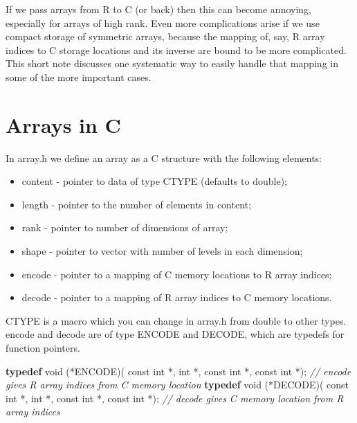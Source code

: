 \documentclass[
  12pt,
]{article}
\newenvironment{Shaded}{\begin{snugshade}}{\end{snugshade}}
\newcommand{\CommentTok}[1]{\textcolor[rgb]{0.56,0.35,0.01}{\textit{#1}}}
\newcommand{\DataTypeTok}[1]{\textcolor[rgb]{0.13,0.29,0.53}{#1}}
\newcommand{\KeywordTok}[1]{\textcolor[rgb]{0.13,0.29,0.53}{\textbf{#1}}}
\newcommand{\NormalTok}[1]{#1}
\providecommand{\tightlist}{%
  \setlength{\itemsep}{0pt}\setlength{\parskip}{0pt}}
\begin{document}
If we pass arrays from R to C (or back) then this can become annoying,
especially for arrays of high rank. Even more complications arise if we
use compact storage of symmetric arrays, because the mapping of, say, R
array indices to C storage locations and its inverse are bound to be
more complicated. This short note discusses one systematic way to easily
handle that mapping in some of the more important cases.

\hypertarget{arrays-in-c}{%
\section{Arrays in C}\label{arrays-in-c}}

In array.h we define an array as a C structure with the following
elements:

\begin{itemize}
\tightlist
\item
  content - pointer to data of type CTYPE (defaults to double);
\item
  length - pointer to the number of elements in content;
\item
  rank - pointer to number of dimensions of array;
\item
  shape - pointer to vector with number of levels in each dimension;
\item
  encode - pointer to a mapping of C memory locations to R array
  indices;
\item
  decode - pointer to a mapping of R array indices to C memory
  locations.
\end{itemize}

CTYPE is a macro which you can change in array.h from double to other
types. encode and decode are of type ENCODE and DECODE, which are
typedefs for function pointers.

\begin{Shaded}
\begin{Highlighting}[]
\KeywordTok{typedef} \DataTypeTok{void}\NormalTok{ (*ENCODE)(}
    \DataTypeTok{const} \DataTypeTok{int}\NormalTok{ *, }\DataTypeTok{int}\NormalTok{ *, }\DataTypeTok{const} \DataTypeTok{int}\NormalTok{ *,}
    \DataTypeTok{const} \DataTypeTok{int}\NormalTok{ *); }\CommentTok{// encode gives R array indices from C memory location}
\KeywordTok{typedef} \DataTypeTok{void}\NormalTok{ (*DECODE)(}
    \DataTypeTok{const} \DataTypeTok{int}\NormalTok{ *, }\DataTypeTok{int}\NormalTok{ *, }\DataTypeTok{const} \DataTypeTok{int}\NormalTok{ *,}
    \DataTypeTok{const} \DataTypeTok{int}\NormalTok{ *); }\CommentTok{// decode gives C memory location from R array indices}
\end{Highlighting}
\end{Shaded}
\end{document}
